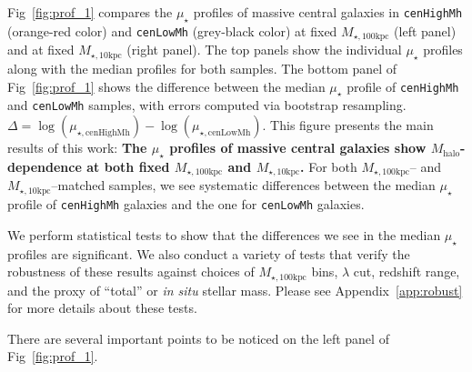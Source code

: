 \documentclass[a4paper,fleqn,usenatbib]{mnras}
\def\rbcg{\texttt{cenHighMh}}
\def\nbcg{\texttt{cenLowMh}}
\def\mhalo{{$M_{\mathrm{halo}}$}}
\def\minn{{$M_{\star,10\mathrm{kpc}}$}}
\def\mtot{{$M_{\star,100\mathrm{kpc}}$}}
\def\mden{{$\mu_{\star}$}}
\begin{document}
    Fig~\ref{fig:prof_1} compares the \mden{} profiles of massive central galaxies 
    in \rbcg{} (orange-red color) and \nbcg{} (grey-black color) at fixed \mtot{} 
    (left panel) and at fixed \minn{} (right panel). 
    The top panels show the individual \mden{} profiles along with the median profiles 
    for both samples. 
    The bottom panel of Fig~\ref{fig:prof_1} shows the difference between the median 
    \mden{} profile of \rbcg{} and \nbcg{} samples, with errors computed via bootstrap 
    resampling.
    $\Delta = \log(\mu_{\star, \mathrm{cenHighMh}}) - 
    \log(\mu_{\star, \mathrm{cenLowMh}})$. 
    This figure presents the main results of this work: \textbf{The \mden{} profiles of 
    massive central galaxies show \mhalo{}-dependence at both fixed \mtot{} and 
    \minn{}.}
    For both \mtot{}-- and \minn{}--matched samples, we see systematic differences
    between the median \mden{} profile of \rbcg{} galaxies and the one for \nbcg{}
    galaxies. 

    We perform statistical tests to show that the differences we see in the median 
    \mden{} profiles are significant. 
    We also conduct a variety of tests that verify the robustness of these results 
    against choices of \mtot{} bins, $\lambda$ cut, redshift range, and the proxy
    of ``total'' or \textit{in situ} stellar mass. 
    Please see Appendix~\ref{app:robust} for more details about these tests.
   
    There are several important points to be noticed on the left panel of 
    Fig~\ref{fig:prof_1}. 
    
\end{document}

